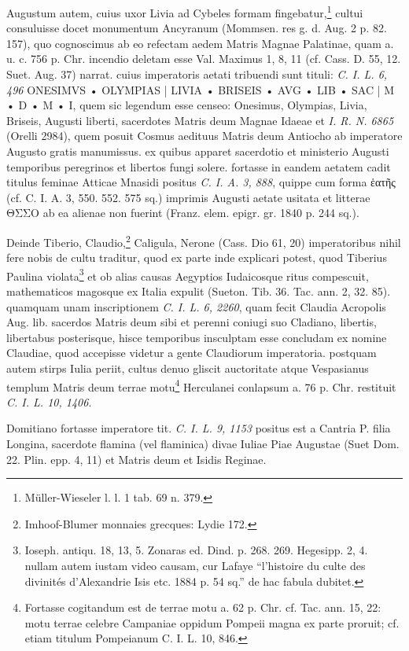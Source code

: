\documentclass[a4paper, 11pt, oneside, polutonikogreek, german]{article}
\begin{document}
Augustum autem, cuius uxor Livia ad Cybeles formam fingebatur,\footnote{Müller-Wieseler l. l. 1 tab. 69 n. 379.} cultui consuluisse docet monumentum Ancyranum (Mommsen. res g. d. Aug. 2 p. 82. 157), quo cognoscimus ab eo refectam aedem Matris Magnae Palatinae, quam a. u. c. 756 p. Chr. incendio deletam esse Val. Maximus 1, 8, 11 (cf. Cass. D. 55, 12. Suet. Aug. 37) narrat. cuius imperatoris aetati tribuendi sunt tituli: \emph{C. I. L. 6, 496} ONESIMVS • OLYMPIAS | LIVIA • BRISEIS • AVG • LIB • SAC | M • D • M • I, quem sic legendum esse censeo: Onesimus, Olympias, Livia, Briseis, Augusti liberti, sacerdotes Matris deum Magnae Idaeae et \emph{I. R. N. 6865} (Orelli 2984), quem posuit Cosmus aedituus Matris deum Antiocho ab imperatore Augusto gratis manumissus. ex quibus apparet sacerdotio et ministerio Augusti temporibus peregrinos et libertos fungi solere. fortasse in eandem aetatem cadit titulus feminae Atticae Mnasidi positus \emph{C. I. A. 3, 888}, quippe cum forma ἑατῆς (cf. C. I. A. 3, 550. 552. 575 sq.) imprimis Augusti aetate usitata et litterae ΘΣΣΟ ab ea alienae non fuerint (Franz. elem. epigr. gr. 1840 p. 244 sq.).

Deinde Tiberio, Claudio,\footnote{Imhoof-Blumer monnaies grecques: Lydie 172.} Caligula, Nerone (Cass. Dio 61, 20) imperatoribus nihil fere nobis de cultu traditur, quod ex parte inde explicari potest, quod Tiberius Paulina violata\footnote{Ioseph. antiqu. 18, 13, 5. Zonaras ed. Dind. p. 268. 269. Hegesipp. 2, 4. nullam autem iustam video causam, cur Lafaye "`l'histoire du culte des divinités d'Alexandrie Isis etc. 1884 p. 54 sq."' de hac fabula dubitet.} et ob alias causas Aegyptios Iudaicosque ritus compescuit, mathematicos magosque ex Italia expulit (Sueton. Tib. 36. Tac. ann. 2, 32. 85). quamquam unam inscriptionem \emph{C. I. L. 6, 2260}, quam fecit Claudia Acropolis Aug. lib. sacerdos Matris deum sibi et perenni coniugi suo Cladiano, libertis, libertabus posterisque, hisce temporibus insculptam esse concludam ex nomine Claudiae, quod accepisse videtur a gente Claudiorum imperatoria. postquam autem stirps Iulia periit, cultus denuo gliscit auctoritate atque Vespasianus templum Matris deum terrae motu\footnote{Fortasse cogitandum est de terrae motu a. 62 p. Chr. cf. Tac. ann. 15, 22: motu terrae celebre Campaniae oppidum Pompeii magna ex parte proruit; cf. etiam titulum Pompeianum C. I. L. 10, 846.} Herculanei conlapsum a. 76 p. Chr. restituit \emph{C. I. L. 10, 1406}.

Domitiano fortasse imperatore tit. \emph{C. I. L. 9, 1153} positus est a Cantria P. filia Longina, sacerdote flamina (vel flaminica) divae Iuliae Piae Augustae (Suet Dom. 22. Plin. epp. 4, 11) et Matris deum et Isidis Reginae.
\end{document}
